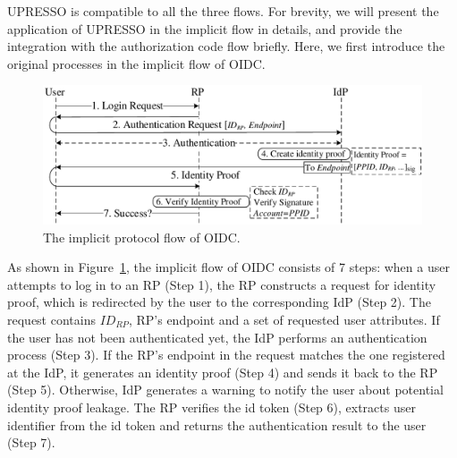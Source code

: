UPRESSO is compatible to all the three flows.
For brevity, we will present the application of UPRESSO in the implicit flow in details, and provide the integration with the authorization code flow briefly. 
Here, we first introduce the original processes in the implicit flow of OIDC.
\begin{figure}[t]
  \centering
  \includegraphics[width=\linewidth]{fig/OIDC1.pdf}
  \caption{The implicit protocol flow of OIDC.}
  \label{fig:OpenID}
\end{figure}
As shown in Figure~\ref{fig:OpenID}, the implicit flow of OIDC consists of 7 steps: when a user attempts to log in to an RP (Step 1), the RP constructs a request for identity proof, which is redirected by the user to the corresponding IdP (Step 2). The request contains $ID_{RP}$, RP's endpoint and a set of requested user attributes. If the user has not been authenticated yet, the IdP performs an authentication process (Step 3). If the RP's endpoint in the request matches the one registered at the IdP, it generates an identity proof (Step 4) and sends it back to the RP (Step 5). Otherwise, IdP generates a warning to notify the user about potential identity proof leakage. The RP verifies the id token (Step 6), extracts user identifier from the id token and returns the authentication result to the user (Step 7).



